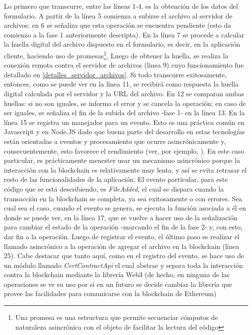 Lo primero que transcurre, entre las líneas 1-4, es la obtención de los datos del formulario. A partir de la línea 5 comienza a subirse el archivo al servidor de archivos: en 6 se señaliza que esta operación se encuentra pendiente (esto da comienzo a la fase 1 anteriormente descripta). En la línea 7 se procede a calcular la huella digital del archivo dispuesto en el formulario, es decir, en la aplicación cliente, haciendo uso de promesas\footnote{Una promesa es una estructura que permite secuenciar cómputos de naturaleza asincrónica con el objeto de facilitar la lectura del código}. Luego de obtener la huella, se realiza la conexión remota contra el servidor de archivos (linea 9) cuyo funcionamiento fue detallado en \ref{detalles_servidor_archivos}. Si todo transcurre exitosamente, entonces, como se puede ver en la línea 11, se recibirá como respuesta la huella digital calculada por el servidor y la URL del archivo. En 12 se comparan ambas huellas: si no son iguales, se informa el error y se cancela la operación; en caso de ser iguales, se señaliza el fin de la subida del archivo -fase 1- en la línea 13.
En la línea 15 se registra un manejador para un evento. Esto es una práctica común en Javascript y en Node.JS dado que buena parte del desarrollo en estas tecnologías están orientadas a eventos y procesamiento que ocurre asincrónicamente y, consecuentemente, esto favorece el rendimiento (ver, por ejemplo, \cite{TilkovVinoski2010}). En este caso particular, es prácticamente menester usar un mecanismo asincrónico porque la interacción con la blockchain es relativamente muy lenta, y así se evita retrasar el resto de las funcionalidades de la aplicación. El evento particular, para este código que se está describiendo, es \textit{FileAdded}, el cual se dispara cuando la transacción en la blockchain se completa, ya sea exitosamente o con errores. Sea cual sea el caso, cuando el evento se genera, se ejecuta la función asociada a él en donde se puede ver, en la línea 17, que se vuelve a hacer uso de la señalización para cambiar el estado de la operación -marcando el fin de la fase 2- y, con esto, dar fin a la operación.
Luego de registrar el evento, el último paso es realizar el llamado asincrónico a la operación de agregar el archivo en la blockchain (línea 25). Cabe destacar que tanto aquí, como en el registro del evento, se hace uso de un módulo llamado \textit{CertContractApi} el cual abstrae y separa toda la interacción contra la blockchain mediante la librería Web3 (de hecho, en ninguna de las operaciones se ve su uso por si en un futuro se decide cambiar la librería que provee las facilidades para comunicarse con la blockchain de Ethereum)

